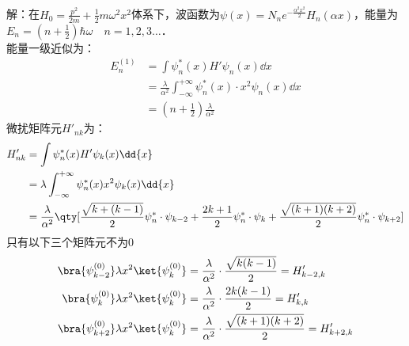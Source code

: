 \subsection{ }
解：在$H_0=\frac{p^2}{2m}+\frac{1}{2}m\omega^2x^2$体系下，波函数为$\psi(x)=N_ne^{-\frac{\alpha^2x^2}{2}}H_n(\alpha x) $，能量为$E_n=(n+\frac{1}{2})\hbar\omega \quad n=1,2,3\dots$．\\
能量一级近似为：
\begin{equation}
\begin{aligned}
E^{(1)}_n&=\int \psi^*_n(x)H'\psi_n(x)\dd{x} \\
&=\frac{\lambda}{\alpha^2}\int^{+\infty}_{-\infty}\psi^*_n(x)\cdot x^2\psi_n(x)\dd{x} \\
&=(n+\frac{1}{2})\frac{\lambda}{\alpha^2}
\end{aligned}
\end{equation}
微扰矩阵元$H'_{nk}$为：
\begin{equation}
\begin{aligned}
H'_{nk}&=\int\psi^*_n(x)H'\psi_k(x)\dd{x}\\
&=\lambda\int^{+\infty}_{-\infty}\psi^*_n(x)x^2\psi_k(x)\dd{x}\\
&=\frac{\lambda}{\alpha^2}\qty[\frac{\sqrt{k+(k-1)}}{2}\psi^*_n\cdot\psi_{k-2}+\frac{2k+1}{2}\psi^*_n\cdot\psi_k+\frac{\sqrt{(k+1)(k+2)}}{2}\psi^*_n\cdot\psi_{k+2}]
\end{aligned}
\end{equation}
只有以下三个矩阵元不为0
\begin{equation}
\begin{aligned}
\bra{\psi^{(0)}_{k-2}}\lambda x^2\ket{\psi^{(0)}_k}&=\frac{\lambda}{\alpha^2}\cdot\frac{\sqrt{k(k-1)}}{2}=H'_{k-2,k}\\
\bra{\psi^{(0)}_{k}}\lambda x^2\ket{\psi^{(0)}_k}&=\frac{\lambda}{\alpha^2}\cdot\frac{2k(k-1)}{2}=H'_{k,k}\\
\bra{\psi^{(0)}_{k+2}}\lambda x^2\ket{\psi^{(0)}_k}&=\frac{\lambda}{\alpha^2}\cdot\frac{\sqrt{(k+1)(k+2)}}{2}=H'_{k+2,k}\\
\end{aligned}
\end{equation}
